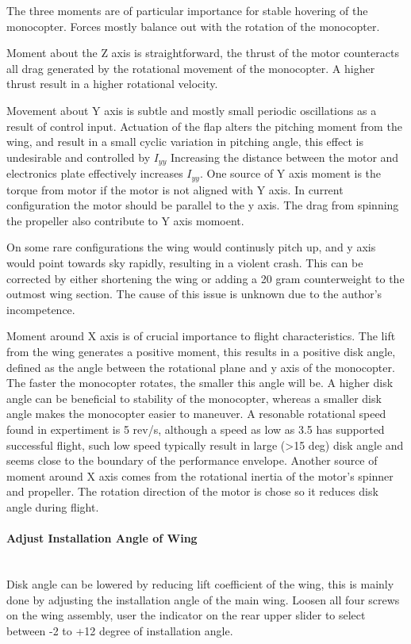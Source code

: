 \documentclass[12pt]{article}
\newcommand{\pa}[1]{\paragraph{#1}\mbox{}\\}
\begin{document}
The three moments are of particular importance for stable hovering of the monocopter. Forces mostly balance out with the rotation of the monocopter.

Moment about the Z axis is straightforward, the thrust of the motor counteracts all drag generated by the rotational movement of the monocopter. A higher thrust result in a higher rotational velocity.

Movement about Y axis is subtle and mostly small periodic oscillations as a result of control input. Actuation of the flap alters the pitching moment from the wing, and result in a small cyclic variation in pitching angle, this effect is undesirable and controlled by $I_{yy}$ Increasing the distance between the motor and electronics plate effectively increases $I_{yy}$. 
One source of Y axis moment is the torque from motor if the motor is not aligned with Y axis. In current configuration the motor should be parallel to the y axis. The drag from spinning the propeller also contribute to Y axis momoent.

On some rare configurations the wing would continusly pitch up, and y axis would point towards sky rapidly, resulting in a violent crash. This can be corrected by either shortening the wing or adding a 20 gram counterweight to the outmost wing section. The cause of this issue is unknown due to the author's incompetence. 

Moment around X axis is of crucial importance to flight characteristics. The lift from the wing generates a positive moment, this results in a positive disk angle, defined as the angle between the rotational plane and y axis of the monocopter. The faster the monocopter rotates, the smaller this angle will be. A higher disk angle can be beneficial to stability of the monocopter, whereas a smaller disk angle makes the monocopter easier to maneuver. A resonable rotational speed found in expertiment is 5 rev/s, although a speed as low as 3.5 has supported successful flight, such low speed typically result in large (>15 deg) disk angle and seems close to the boundary of the performance envelope. Another source of moment around X axis comes from the rotational inertia of the motor's spinner and propeller. The rotation direction of the motor is chose so it reduces disk angle during flight. 

\pa{Adjust Installation Angle of Wing}
Disk angle can be lowered by reducing lift coefficient of the wing, this is mainly done by adjusting the installation angle of the main wing. Loosen all four screws on the wing assembly, user the indicator on the rear upper slider to select between -2 to +12 degree of installation angle. 
\end{document}
